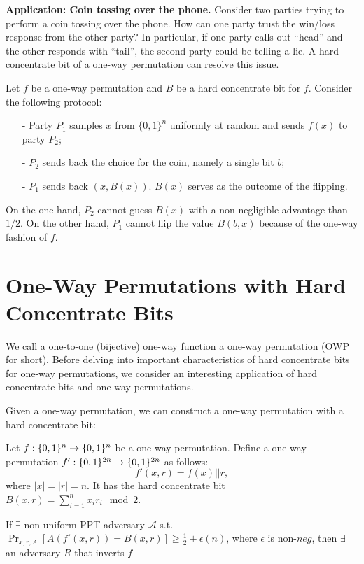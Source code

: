 \documentclass[12pt]{tufte-book}
\newcommand{\ma}{\mathcal{A}}
\begin{document}
\bigskip
\noindent\textbf{Application: Coin tossing over the phone.}
Consider two parties trying to perform a coin tossing over the phone.  How can one party trust the win/loss response from the other party?  In particular, if one party calls out ``head'' and the other responds with ``tail'', the second party could be telling a lie.
A hard concentrate bit of a one-way permutation can resolve this issue.

Let $f$ be a one-way permutation and $B$ be a hard concentrate bit for $f$. Consider the following protocol:
\begin{itemize}
\item[-] Party $P_1$ samples $x$ from $\{0,1\}^n$ uniformly at random and sends $f(x)$ to party $P_2$;
\item[-] $P_2$ sends back the choice for the coin, namely a single bit $b$;
\item[-] $P_1$ sends back $(x, B(x))$.  $B(x)$ serves as the outcome of the flipping.
\end{itemize}
On the one hand, $P_2$ cannot guess $B(x)$ with a non-negligible advantage than $1/2$.
On the other hand, $P_1$ cannot flip the value $B(b,x)$  because of the one-way fashion of $f$. 

\section{One-Way Permutations with Hard Concentrate Bits}
We call a one-to-one (bijective) one-way function a one-way permutation (OWP for short).
Before delving into important characteristics of hard concentrate bits for one-way permutations, we consider an interesting application of hard concentrate bits and one-way permutations.





\bigskip
Given a one-way permutation, we can construct a one-way permutation with a hard concentrate bit:
\begin{theorem}
Let  $f:\{0,1\}^{n} \rightarrow \{0,1\}^{n}$ be a one-way permutation.
Define a one-way permutation $f':\{0,1\}^{2n} \rightarrow \{0,1\}^{2n}$ as follows:
$$f'(x,r) = f(x) || r,$$
where $|x| = |r| =n$. It has the hard concentrate bit $B(x, r) = \sum_{i=1}^n x_i r_i\mod 2$.
\end{theorem}
\proof
{}
If $\exists$ non-uniform PPT adversary $\ma$ s.t. $\Pr_{x,r,A}[A(f'(x,r)) = B(x,r)] \ge \frac{1}{2} + \epsilon(n)$, where $\epsilon$ is non-$neg$, then $\exists$ an adversary $R$ that inverts $f$
\end{document}
